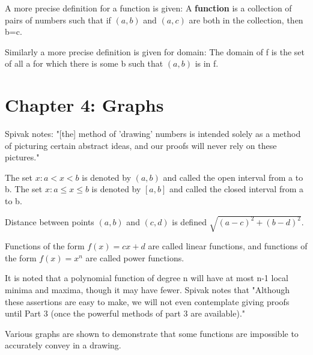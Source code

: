 \documentclass{article}
\begin{document}
\begin{flushleft}
A more precise definition for a function is given: A \textbf{function} is a collection of pairs of numbers such that if $(a,b)$ and $(a,c)$ are both in the collection, then b=c.
\end{flushleft}

\begin{flushleft}
Similarly a more precise definition is given for domain: The domain of f is the set of all a for which there is some b such that $(a,b)$ is in f.
\end{flushleft}

\section*{Chapter 4: Graphs}

\begin{flushleft}
Spivak notes: "[the] method of 'drawing' numbers is intended solely as a method of picturing certain abstract ideas, and our proofs will never rely on these pictures."
\end{flushleft}

\begin{flushleft}
The set ${x: a < x < b}$ is denoted by $(a,b)$ and called the open interval from a to b. The set ${x: a \leq x \leq b}$ is denoted by $[a,b]$ and called the closed interval from a to b.
\end{flushleft}

\begin{flushleft}
Distance between points $(a,b)$ and $(c,d)$ is defined $\sqrt{(a-c)^2 + (b-d)^2}$.
\end{flushleft}

\begin{flushleft}
Functions of the form $f(x) = cx + d$ are called linear functions, and functions of the form $f(x) = x^n$ are called power functions.
\end{flushleft}

\begin{flushleft}
It is noted that a polynomial function of degree n will have at most n-1 local minima and maxima, though it may have fewer. Spivak notes that "Although these assertions are easy to make, we will not even contemplate giving proofs until Part 3 (once the powerful methods of part 3 are available)."
\end{flushleft}

\begin{flushleft}
Various graphs are shown to demonstrate that some functions are impossible to accurately convey in a drawing.
\end{flushleft}
\end{document}

